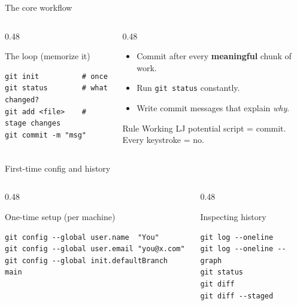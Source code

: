 \documentclass[aspectratio=169]{beamer}
\begin{document}
\begin{frame}[fragile]{The core workflow}
  \begin{columns}[T]
    \begin{column}{0.48\textwidth}
      \begin{block}{The loop (memorize it)}
        \begin{lstlisting}
git init          # once
git status        # what changed?
git add <file>    # stage changes
git commit -m "msg"
        \end{lstlisting}
      \end{block}
    \end{column}
    \begin{column}{0.48\textwidth}
      \begin{itemize}
        \item Commit after every \textbf{meaningful} chunk of work.
        \item Run \texttt{git status} constantly.
        \item Write commit messages that explain \emph{why}.
      \end{itemize}
      \vspace{0.3cm}
      \begin{alertblock}{Rule}
        Working LJ potential script = commit.
        Every keystroke = no.
      \end{alertblock}
    \end{column}
  \end{columns}
\end{frame}

\begin{frame}[fragile]{First-time config and history}
  \begin{columns}[T]
    \begin{column}{0.48\textwidth}
      \begin{block}{One-time setup (per machine)}
        \begin{lstlisting}
git config --global user.name  "You"
git config --global user.email "you@x.com"
git config --global init.defaultBranch main
        \end{lstlisting}
      \end{block}
    \end{column}
    \begin{column}{0.48\textwidth}
      \begin{block}{Inspecting history}
        \begin{lstlisting}
git log --oneline
git log --oneline --graph
git status
git diff
git diff --staged
        \end{lstlisting}
      \end{block}
    \end{column}
  \end{columns}
\end{frame}
\end{document}
